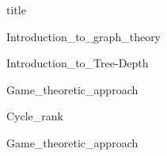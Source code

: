 \documentclass[a4paper,12pt]{article}
\begin{document}
{title}
	
{Introduction_to_graph_theory}

{Introduction_to_Tree-Depth}

{Game_theoretic_approach}

{Cycle_rank}

{Game_theoretic_approach}
\end{document}
